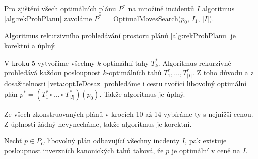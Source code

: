 Pro zjištění všech optimálních plánu $P^*$ na množině incidentů $I$ algoritmus \ref{alg:rekProhPlanu} zavoláme $P^* = $ OptimalMovesSearch($p_0$, $I_1$, $|I|$).

\begin{veta}
  Algoritmus rekurzivního prohledávání prostoru plánů \ref{alg:rekProhPlanu} je korektní a úplný.
\end{veta}
\begin{dukaz}
  V kroku 5 vytvoříme všechny $k$-optimální tahy $T^*_k$.
  Algoritmus rekurzivně prohledává každou posloupnost $k$-optimálních tahů $T^*_1, \dots, T^*_{|I|}$.
  Z toho důvodu a z dosažitelnosti \ref{veta:optJeDosaz} prohledáme i cestu tvořící libovolný optimální plán $p^* = (T^*_1 \circ \dots \circ T^*_{|I|})(p_0)$.
  Takže algoritmus je úplný.

  Ze všech zkonstruovaných plánů v krocích 10 až 14 vybíráme ty s nejnižší cenou.
  Z úplnosti žádný nevynecháme, takže algoritmus je korektní.
\end{dukaz}


\begin{veta}
  Nechť $p \in P_C$ libovolný plán odbavující všechny incdenty $I$, pak existuje posloupnost inverzních kanonických tahů taková, že $p$ je optimální v ceně na $I$.
\end{veta}


%
%
%

